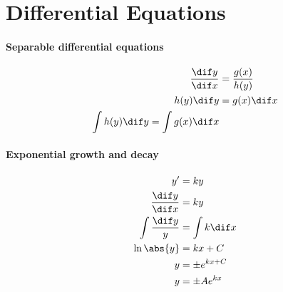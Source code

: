 \section{Differential Equations}
\paragraph{Separable differential equations}
	\begin{align}
		\frac{\dif y}{\dif x} &= \frac{g(x)}{h(y)}\\
		h(y) \dif y &= g(x) \dif x\\
		\int h(y) \dif y = \int g(x) \dif x
	\end{align}
\paragraph{Exponential growth and decay}
	\begin{align}
		y' &= ky\\
		\frac{\dif y}{\dif x} &= ky\\
		\int \frac{\dif y}{y} &= \int k \dif x\\
		\ln\abs{y} &= kx + C\\
		y &= \pm e^{kx + C}\\
		y &= \pm Ae^{kx}
	\end{align}
